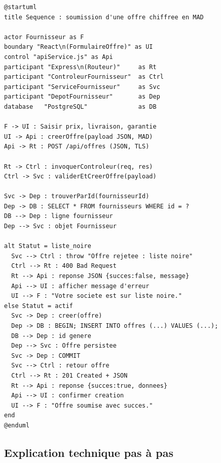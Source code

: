 \documentclass[a4paper,11pt,openany]{report}
\begin{document}
\begin{lstlisting}[caption={Séquence --- Soumission d'une offre par un fournisseur},
                   label={lst:umlSequence}]
@startuml
title Sequence : soumission d'une offre chiffree en MAD

actor Fournisseur as F
boundary "React\n(FormulaireOffre)" as UI
control "apiService.js" as Api
participant "Express\n(Routeur)"     as Rt
participant "ControleurFournisseur"  as Ctrl
participant "ServiceFournisseur"     as Svc
participant "DepotFournisseur"       as Dep
database   "PostgreSQL"              as DB

F -> UI : Saisir prix, livraison, garantie
UI -> Api : creerOffre(payload JSON, MAD)
Api -> Rt : POST /api/offres (JSON, TLS)

Rt -> Ctrl : invoquerControleur(req, res)
Ctrl -> Svc : validerEtCreerOffre(payload)

Svc -> Dep : trouverParId(fournisseurId)
Dep -> DB : SELECT * FROM fournisseurs WHERE id = ?
DB --> Dep : ligne fournisseur
Dep --> Svc : objet Fournisseur

alt Statut = liste_noire
  Svc --> Ctrl : throw "Offre rejetee : liste noire"
  Ctrl --> Rt : 400 Bad Request
  Rt --> Api : reponse JSON {succes:false, message}
  Api --> UI : afficher message d'erreur
  UI --> F : "Votre societe est sur liste noire."
else Statut = actif
  Svc -> Dep : creer(offre)
  Dep -> DB : BEGIN; INSERT INTO offres (...) VALUES (...);
  DB --> Dep : id genere
  Dep --> Svc : Offre persistee
  Svc -> Dep : COMMIT
  Svc --> Ctrl : retour offre
  Ctrl --> Rt : 201 Created + JSON
  Rt --> Api : reponse {succes:true, donnees}
  Api --> UI : confirmer creation
  UI --> F : "Offre soumise avec succes."
end
@enduml
\end{lstlisting}

\subsection{Explication technique pas à pas}
\end{document}
